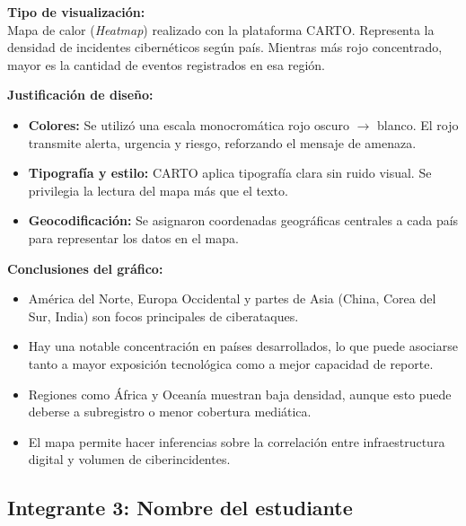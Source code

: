 \documentclass[12pt, a4paper]{article}
\begin{document}
\vspace{0.5em}
\textbf{Tipo de visualización:} \\
Mapa de calor (\textit{Heatmap}) realizado con la plataforma CARTO. Representa la densidad de incidentes cibernéticos según país. Mientras más rojo concentrado, mayor es la cantidad de eventos registrados en esa región.

\vspace{0.5em}
\textbf{Justificación de diseño:} \\
\begin{itemize}
    \item \textbf{Colores:} Se utilizó una escala monocromática rojo oscuro $\rightarrow$ blanco. El rojo transmite alerta, urgencia y riesgo, reforzando el mensaje de amenaza.
    \item \textbf{Tipografía y estilo:} CARTO aplica tipografía clara sin ruido visual. Se privilegia la lectura del mapa más que el texto.
    \item \textbf{Geocodificación:} Se asignaron coordenadas geográficas centrales a cada país para representar los datos en el mapa.
\end{itemize}

\vspace{0.5em}
\textbf{Conclusiones del gráfico:} \\
\begin{itemize}
    \item América del Norte, Europa Occidental y partes de Asia (China, Corea del Sur, India) son focos principales de ciberataques.
    \item Hay una notable concentración en países desarrollados, lo que puede asociarse tanto a mayor exposición tecnológica como a mejor capacidad de reporte.
    \item Regiones como África y Oceanía muestran baja densidad, aunque esto puede deberse a subregistro o menor cobertura mediática.
    \item El mapa permite hacer inferencias sobre la correlación entre infraestructura digital y volumen de ciberincidentes.
\end{itemize}

\newpage
\subsection*{Integrante 3: Nombre del estudiante}

\end{document}
